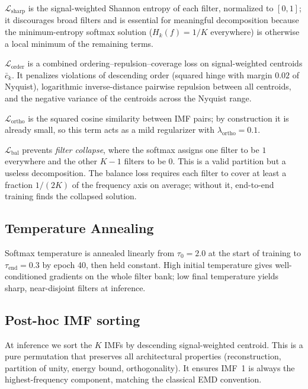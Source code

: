 \documentclass[journal]{IEEEtran}
\begin{document}
$\mathcal{L}_{\text{sharp}}$ is the signal-weighted Shannon entropy of each filter, normalized to $[0, 1]$; it discourages broad filters and is essential for meaningful decomposition because the minimum-entropy softmax solution ($H_{k}(f) = 1/K$ everywhere) is otherwise a local minimum of the remaining terms.

$\mathcal{L}_{\text{order}}$ is a combined ordering--repulsion--coverage loss on signal-weighted centroids $\bar{c}_{k}$. It penalizes violations of descending order (squared hinge with margin $0.02$ of Nyquist), logarithmic inverse-distance pairwise repulsion between all centroids, and the negative variance of the centroids across the Nyquist range.

$\mathcal{L}_{\text{ortho}}$ is the squared cosine similarity between IMF pairs; by construction it is already small, so this term acts as a mild regularizer with $\lambda_{\text{ortho}} = 0.1$.

$\mathcal{L}_{\text{bal}}$ prevents \emph{filter collapse}, where the softmax assigns one filter to be $1$ everywhere and the other $K-1$ filters to be $0$. This is a valid partition but a useless decomposition. The balance loss requires each filter to cover at least a fraction $1/(2K)$ of the frequency axis on average; without it, end-to-end training finds the collapsed solution.

\subsection{Temperature Annealing}
\label{sec:training}

Softmax temperature is annealed linearly from $\tau_{0} = 2.0$ at the start of training to $\tau_{\text{end}} = 0.3$ by epoch 40, then held constant. High initial temperature gives well-conditioned gradients on the whole filter bank; low final temperature yields sharp, near-disjoint filters at inference.

\subsection{Post-hoc IMF sorting}

At inference we sort the $K$ IMFs by descending signal-weighted centroid. This is a pure permutation that preserves all architectural properties (reconstruction, partition of unity, energy bound, orthogonality). It ensures IMF~1 is always the highest-frequency component, matching the classical EMD convention.

\end{document}
